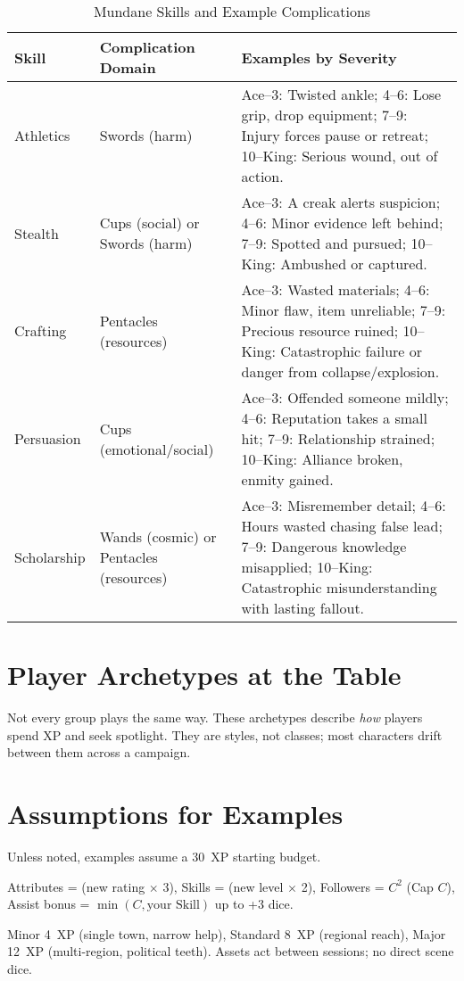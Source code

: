 \documentclass[12pt]{article}
\begin{document}
\begin{table}[h]
\centering
\begin{tabular}{|p{2cm}|p{3cm}|p{7cm}|}
\hline
\textbf{Skill} & \textbf{Complication Domain} & \textbf{Examples by Severity} \\
\hline
Athletics & Swords (harm) &  
Ace–3: Twisted ankle;  
4–6: Lose grip, drop equipment;  
7–9: Injury forces pause or retreat;  
10–King: Serious wound, out of action. \\
\hline
Stealth & Cups (social) or Swords (harm) &  
Ace–3: A creak alerts suspicion;  
4–6: Minor evidence left behind;  
7–9: Spotted and pursued;  
10–King: Ambushed or captured. \\
\hline
Crafting & Pentacles (resources) &  
Ace–3: Wasted materials;  
4–6: Minor flaw, item unreliable;  
7–9: Precious resource ruined;  
10–King: Catastrophic failure or danger from collapse/explosion. \\
\hline
Persuasion & Cups (emotional/social) &  
Ace–3: Offended someone mildly;  
4–6: Reputation takes a small hit;  
7–9: Relationship strained;  
10–King: Alliance broken, enmity gained. \\
\hline
Scholarship & Wands (cosmic) or Pentacles (resources) &  
Ace–3: Misremember detail;  
4–6: Hours wasted chasing false lead;  
7–9: Dangerous knowledge misapplied;  
10–King: Catastrophic misunderstanding with lasting fallout. \\
\hline
\end{tabular}
\caption{Mundane Skills and Example Complications}
\end{table}

\section{Player Archetypes at the Table}

Not every group plays the same way. These archetypes describe \emph{how} players spend XP and seek spotlight. They are styles, not classes; most characters drift between them across a campaign.

\section{Assumptions for Examples}
Unless noted, examples assume a 30~XP starting budget.
\begin{description}[leftmargin=2cm]
  \item[Costs:] Attributes = (new rating $\times$ 3), Skills = (new level $\times$ 2), Followers = $C^2$ (Cap $C$), Assist bonus = $\min(C,\text{your Skill})$ up to +3 dice.
  \item[Off-Screen Assets:] Minor 4~XP (single town, narrow help), Standard 8~XP (regional reach), Major 12~XP (multi-region, political teeth). Assets act between sessions; no direct scene dice.
\end{description}
\end{document}
